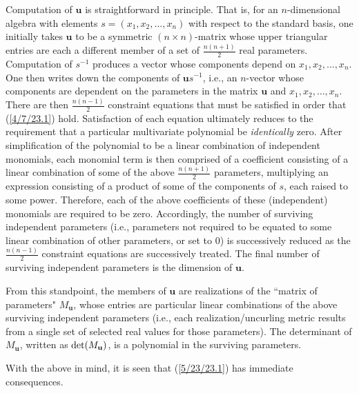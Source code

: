 \documentclass{amsart}
\numberwithin{equation}{section}
\theoremstyle{definition}
\numberwithin{theorem}{section}
\begin{document}
Computation of $\mathbf{u}$ is straightforward in principle.  That is, for an $n$-dimensional algebra with elements $s = (x_1,x_2,\dots,x_n)$ with respect to the standard basis, one initially takes $\mathbf{u}$ to be a symmetric $(n\times n)$-matrix  whose upper triangular entries are each a different member of a set of $\frac{n(n+1)}{2}$ real parameters.  Computation of $s^{-1}$ produces a vector whose components depend on $x_1,x_2,\dots,x_n$.  One then writes down the components of $\mathbf{u}s^{-1}$, i.e., an $n$-vector whose components are dependent on the parameters in the matrix $\mathbf{u}$ and $x_1,x_2,\dots,x_n$.  There are then $\frac{n(n-1)}{2}$ constraint equations that must be satisfied in order that (\ref{4/7/23.1}) hold.  Satisfaction of each equation ultimately reduces to the requirement that a particular multivariate polynomial be {\it identically} zero.  After simplification of the polynomial to be a linear combination of independent monomials, each monomial term is then comprised of a coefficient consisting of a linear combination of some of the above $\frac{n(n+1)}{2}$ parameters, multiplying an expression consisting of a product of some of the components of $s$, each raised to some power.  Therefore, each of the above coefficients of these (independent) monomials are required to be zero.  Accordingly, the number of surviving independent parameters (i.e., parameters not required to be equated to some linear combination of other parameters, or set to 0) is successively reduced as the $\frac{n(n-1)}{2}$ constraint equations are successively treated.  The final number of surviving independent parameters is the dimension of $\mathbf{u}$.

From this standpoint, the members of $\mathbf{u}$ are realizations of the ``matrix of parameters" $M_{\mathbf{u}}$, whose entries are particular linear combinations of the above surviving independent parameters (i.e., each realization/uncurling metric results from a single set of selected real values for those parameters).  The determinant of $M_{\mathbf{u}}$, written as ${\rm det}(M_{\mathbf{u}})$, is a polynomial in the surviving parameters.  

\enlargethispage{1cm}

   With the above in mind, it is seen that (\ref{5/23/23.1}) has immediate consequences.
    
  
    
\end{document}
